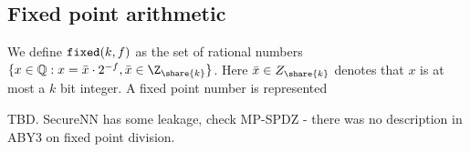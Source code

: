 \subsection{Fixed point arithmetic}
\label{subsec:fixed-point}

We define $\verb|fixed|(k, f)$ as the set of rational numbers $\{x \in
\mathbb{Q} : x = \bar{x} \cdot 2^{-f}, \bar{x} \in \Z_{\share{k}}\}$. Here $\bar{x}
\in Z_{\share{k}}$ denotes that $x$ is at most a $k$ bit integer. A fixed point number
is represented




TBD. SecureNN has some leakage, check MP-SPDZ - there was no description in
ABY3 on fixed point division.

